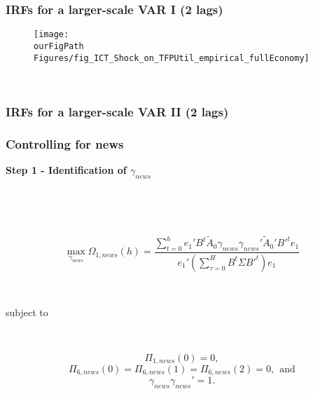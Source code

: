 \documentclass{beamer}
\def \ourFigPath {../../}
\def\myFigWidthAlt{1.5in}
\begin{document}
\begin{frame}
	\frametitle{IRFs for a larger-scale VAR I (2 lags)}
	\label{largeVAR}

\begin{figure}[h!]
\begin{center}
\texttt{[image: \\ourFigPath Figures/fig\_ICT\_Shock\_on\_TFPUtil\_empirical\_fullEconomy]}
\end{center}
\end{figure}

\

\hyperlink{results2}{}	
\end{frame}

\begin{frame}
	\frametitle{IRFs for a larger-scale VAR II (2 lags)}
	
\begin{figure}[h!]

 \hspace{.2in%
} 
 \hspace{.2in%
} 
 \hspace{.2in%
} 
 \hspace{.2in%
} 
 \hspace{.2in%
} 
\end{figure}


\end{frame}



\begin{frame}
	\frametitle{Controlling for news}
	\label{controlling_news}
\textbf{Step 1 - Identification of $\gamma_{news}$} 	

\

\

$$
\max_{\gamma_{news}} \Omega_{1,news}(h) = \frac{ \sum_{t=0}^h e_1' B^t \tilde{A}_0 \gamma_{news} \gamma_{news}' \tilde{A}_0' B'^t e_1 } {e_1' ( \sum_{\tau = 0}^H B^t \Sigma B'^t )e_1}
$$

\

subject to

\

$$
\Pi_{1,news}(0) = 0,
$$
$$
\Pi_{6,news}(0) = \Pi_{6,news}(1) = \Pi_{6,news}(2) = 0, \ \ \text{and}
$$
$$
\gamma_{news} \gamma_{news}' = 1.
$$


\end{frame}
\end{document}
